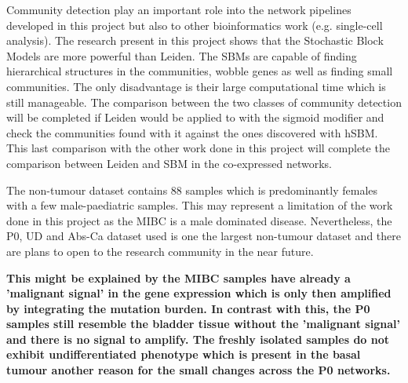 Community detection play an important role into the network pipelines developed in this project but also to other bioinformatics work (e.g. single-cell analysis). The research present in this project shows that the Stochastic Block Models are more powerful than Leiden. The SBMs are capable of finding hierarchical structures in the communities, wobble genes as well as finding small communities. The only disadvantage is their large computational time which is still manageable. The comparison between the two classes of community detection will be completed if Leiden would be applied to with the sigmoid modifier and check the communities found with it against the ones discovered with hSBM. This last comparison with the other work done in this project will complete the comparison between Leiden and SBM in the co-expressed networks.

The non-tumour dataset contains 88 samples which is predominantly females with a few male-paediatric samples. This may represent a limitation of the work done in this project as the MIBC is a male dominated disease. Nevertheless, the P0, UD and Abs-Ca dataset used is one the largest non-tumour dataset and there are plans to open to the research community in the near future.


\textbf{This might be explained by the MIBC samples have already a 'malignant signal' in the gene expression which is only then amplified by integrating the mutation burden. In contrast with this, the P0 samples still resemble the bladder tissue without the 'malignant signal' and there is no signal to amplify. The freshly isolated samples do not exhibit undifferentiated phenotype which is present in the basal tumour another reason for the small changes across the P0 networks.}

